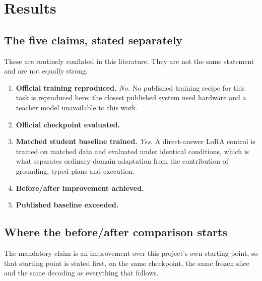 \section{Results}
\label{sec:results}


\subsection{The five claims, stated separately}
\label{sec:results:claims}

These are routinely conflated in this literature. They are not the same statement and are not
equally strong.

\begin{enumerate}
  \item \textbf{Official training reproduced.} \emph{No.} No published training recipe for this task
        is reproduced here; the closest published system used hardware and a teacher model
        unavailable to this work.
  \item \textbf{Official checkpoint evaluated.} 
  \item \textbf{Matched student baseline trained.} \emph{Yes.} A direct-answer LoRA control is
        trained on matched data and evaluated under identical conditions, which is what separates
        ordinary domain adaptation from the contribution of grounding, typed plans and execution.
  \item \textbf{Before/after improvement achieved.} 
  \item \textbf{Published baseline exceeded.} 
\end{enumerate}

\subsection{Where the before/after comparison starts}
\label{sec:results:before}

The mandatory claim is an improvement over this project's own starting point, so that starting
point is stated first, on the same checkpoint, the same frozen slice and the same decoding as
everything that follows.

